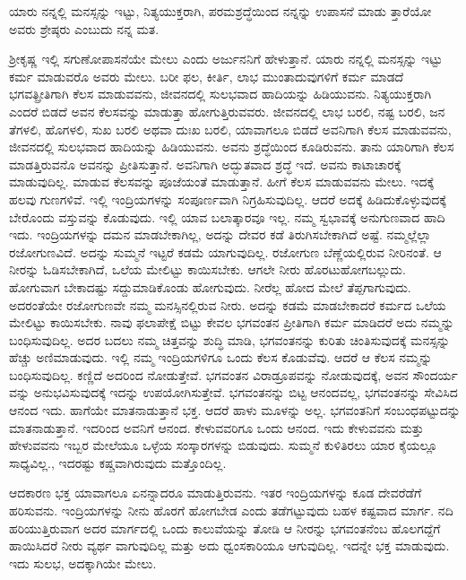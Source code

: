 {\small ಯಾರು ನನ್ನಲ್ಲಿ ಮನಸ್ಸನ್ನು ಇಟ್ಟು, ನಿತ್ಯಯುಕ್ತರಾಗಿ, ಪರಮಶ್ರದ್ಧೆಯಿಂದ ನನ್ನನ್ನು ಉಪಾಸನೆ ಮಾಡು ತ್ತಾರೆಯೋ ಅವರು ಶ್ರೇಷ್ಠರು ಎಂಬುದು ನನ್ನ ಮತ.}

ಶ್ರೀಕೃಷ್ಣ ಇಲ್ಲಿ ಸಗುಣೋಪಾಸನೆಯೇ ಮೇಲು ಎಂದು ಅರ್ಜುನನಿಗೆ ಹೇಳುತ್ತಾನೆ. ಯಾರು ನನ್ನಲ್ಲಿ ಮನಸ್ಸನ್ನು ಇಟ್ಟು ಕರ್ಮ ಮಾಡುವರೊ ಅವರು ಮೇಲು. ಬರೀ ಫಲ, ಕೀರ್ತಿ, ಲಾಭ ಮುಂತಾದುವುಗಳಿಗೆ ಕರ್ಮ ಮಾಡದೆ ಭಗವತ್ಪ್ರೀತಿಗಾಗಿ ಕೆಲಸ ಮಾಡುವವನು, ಜೀವನದಲ್ಲಿ ಸುಲಭವಾದ ಹಾದಿಯನ್ನು ಹಿಡಿಯುವನು. ನಿತ್ಯಯುಕ್ತರಾಗಿ ಎಂದರೆ ಬಿಡದೆ ಅವನ ಕೆಲಸವನ್ನು ಮಾಡುತ್ತಾ ಹೋಗುತ್ತಿರುವವರು. ಜೀವನದಲ್ಲಿ ಲಾಭ ಬರಲಿ, ನಷ್ಟ ಬರಲಿ, ಜನ ತೆಗಳಲಿ, ಹೊಗಳಲಿ, ಸುಖ ಬರಲಿ ಅಥವಾ ದುಃಖ ಬರಲಿ, ಯಾವಾಗಲೂ ಬಿಡದೆ ಅವನಿಗಾಗಿ ಕೆಲಸ ಮಾಡುವವನು, ಜೀವನದಲ್ಲಿ ಸುಲಭವಾದ ಹಾದಿಯನ್ನು ಹಿಡಿಯುವನು. ಅವನು ಶ್ರದ್ಧೆಯಿಂದ ಕೂಡಿರುವನು. ತಾನು ಯಾರಿಗಾಗಿ ಕೆಲಸ ಮಾಡತ್ತಿರುವನೊ ಅವನನ್ನು ಪ್ರೀತಿಸುತ್ತಾನೆ. ಅವನಿಗಾಗಿ ಅದ್ಭುತವಾದ ಶ್ರದ್ಧೆ ಇದೆ. ಅವನು ಕಾಟಾಚಾರಕ್ಕೆ ಮಾಡುವುದಿಲ್ಲ. ಮಾಡುವ ಕೆಲಸವನ್ನು ಪೂಜೆಯಂತೆ ಮಾಡುತ್ತಾನೆ. ಹೀಗೆ ಕೆಲಸ ಮಾಡುವವನು ಮೇಲು. ಇದಕ್ಕೆ ಹಲವು ಗುಣಗಳಿವೆ. ಇಲ್ಲಿ ಇಂದ್ರಿಯಗಳನ್ನು ಸಂಪೂರ್ಣವಾಗಿ ನಿಗ್ರಹಿಸುವುದಿಲ್ಲ. ಆದರೆ ಅದಕ್ಕೆ ಹಿಡಿದುಕೊಳ್ಳುವುದಕ್ಕೆ ಬೇರೊಂದು ವಸ್ತುವನ್ನು ಕೊಡುವುದು. ಇಲ್ಲಿ ಯಾವ ಬಲಾತ್ಕಾರವೂ ಇಲ್ಲ. ನಮ್ಮ ಸ್ವಭಾವಕ್ಕೆ ಅನುಗುಣವಾದ ಹಾದಿ ಇದು. ಇಂದ್ರಿಯಗಳನ್ನು ದಮನ ಮಾಡಬೇಕಾಗಿಲ್ಲ, ಅದನ್ನು ದೇವರ ಕಡೆ ತಿರುಗಿಸಬೇಕಾಗಿದೆ ಅಷ್ಟೆ. ನಮ್ಮಲ್ಲೆಲ್ಲಾ ರಜೋಗುಣವಿದೆ. ಅದನ್ನು ಸುಮ್ಮನೆ ಇಟ್ಟರೆ ಕಡಮೆ ಯಾಗುವುದಿಲ್ಲ. ರಜೋಗುಣ ಬೆಣ್ಣೆಯಲ್ಲಿರುವ ನೀರಿನಂತೆ. ಆ ನೀರನ್ನು ಓಡಿಸಬೇಕಾಗಿದೆ, ಒಲೆಯ ಮೇಲಿಟ್ಟು ಕಾಯಿಸಬೇಕು. ಆಗಲೇ ನೀರು ಹೊರಟುಹೋಗಬಲ್ಲುದು. ಹೋಗುವಾಗ ಬೇಕಾದಷ್ಟು ಸದ್ದುಮಾಡಿಕೊಂಡು ಹೋಗುವುದು. ನೀರೆಲ್ಲ ಹೋದ ಮೇಲೆ ತೆಪ್ಪಗಾಗುವುದು. ಅದರಂತೆಯೇ ರಜೋಗುಣವೇ ನಮ್ಮ ಮನಸ್ಸಿನಲ್ಲಿರುವ ನೀರು. ಅದನ್ನು ಕಡಮೆ ಮಾಡಬೇಕಾದರೆ ಕರ್ಮದ ಒಲೆಯ ಮೇಲಿಟ್ಟು ಕಾಯಿಸಬೇಕು. ನಾವು ಫಲಾಪೇಕ್ಷೆ ಬಿಟ್ಟು ಕೇವಲ ಭಗವಂತನ ಪ್ರೀತಿಗಾಗಿ ಕರ್ಮ ಮಾಡಿದರೆ ಅದು ನಮ್ಮನ್ನು ಬಂಧಿಸುವುದಿಲ್ಲ. ಅದರ ಬದಲು ನಮ್ಮ ಚಿತ್ತವನ್ನು ಶುದ್ಧಿ ಮಾಡಿ, ಭಗವಂತನನ್ನು ಕುರಿತು ಚಿಂತಿಸುವುದಕ್ಕೆ ಮನಸ್ಸನ್ನು ಹೆಚ್ಚು ಅಣಿಮಾಡುವುದು. ಇಲ್ಲಿ ನಮ್ಮ ಇಂದ್ರಿಯಗಳಿಗೂ ಒಂದು ಕೆಲಸ ಕೊಡುವೆವು. ಆದರೆ ಆ ಕೆಲಸ ನಮ್ಮನ್ನು ಬಂಧಿಸುವುದಿಲ್ಲ. ಕಣ್ಣಿದೆ ಅದರಿಂದ ನೋಡುತ್ತೇವೆ. ಭಗವಂತನ ವಿರಾಡ್ರೂಪವನ್ನು ನೋಡುವುದಕ್ಕೆ, ಅವನ ಸೌಂದರ್ಯ ವನ್ನು ಅನುಭವಿಸುವುದಕ್ಕೆ ಇದನ್ನು ಉಪಯೋಗಿಸುತ್ತೇವೆ. ಭಗವಂತನನ್ನು ಬಿಟ್ಟ ಆನಂದವಲ್ಲ, ಭಗವಂತನನ್ನು ಸೇವಿಸಿದ ಆನಂದ ಇದು. ಹಾಗೆಯೇ ಮಾತನಾಡುತ್ತಾನೆ ಭಕ್ತ. ಆದರೆ ಹಾಳು ಮೂಳನ್ನು ಅಲ್ಲ. ಭಗವಂತನಿಗೆ ಸಂಬಂಧಪಟ್ಟುದನ್ನು ಮಾತನಾಡುತ್ತಾನೆ. ಇದರಿಂದ ಅವನಿಗೆ ಆನಂದ. ಕೇಳುವವರಿಗೂ ಒಂದು ಆನಂದ. ಇದು ಕೇಳುವವನು ಮತ್ತು ಹೇಳುವವನು ಇಬ್ಬರ ಮೇಲೆಯೂ ಒಳ್ಳೆಯ ಸಂಸ್ಕಾರಗಳನ್ನು ಬಿಡುವುದು. ಸುಮ್ಮನೆ ಕುಳಿತಿರಲು ಯಾರ ಕೈಯಲ್ಲೂ ಸಾಧ್ಯವಿಲ್ಲ., ಇದರಷ್ಟು ಕಷ್ಚವಾಗಿರುವುದು ಮತ್ತೊಂದಿಲ್ಲ.

ಆದಕಾರಣ ಭಕ್ತ ಯಾವಾಗಲೂ ಏನನ್ನಾದರೂ ಮಾಡುತ್ತಿರುವನು. ಇತರ ಇಂದ್ರಿಯಗಳನ್ನು ಕೂಡ ದೇವರೆಡೆಗೆ ಹರಿಸುವನು. ಇಂದ್ರಿಯಗಳನ್ನು ನೀನು ಹೊರಗೆ ಹೋಗಬೇಡ ಎಂದು ತಡೆಗಟ್ಟುವುದು ಬಹಳ ಕಷ್ಟವಾದ ಮಾರ್ಗ. ನದಿ ಹರಿಯುತ್ತಿರುವಾಗ ಅದರ ಮಾರ್ಗದಲ್ಲಿ ಒಂದು ಕಾಲುವೆಯನ್ನು ತೋಡಿ ಆ ನೀರನ್ನು ಭಗವಂತನೆಂಬ ಹೊಲಗದ್ದೆಗೆ ಹಾಯಿಸಿದರೆ ನೀರು ವ್ಯರ್ಥ ವಾಗುವುದಿಲ್ಲ ಮತ್ತು ಅದು ಧ್ವಂಸಕಾರಿಯೂ ಆಗುವುದಿಲ್ಲ. ಇದನ್ನೇ ಭಕ್ತ ಮಾಡುವುದು. ಇದು ಸುಲಭ, ಅದಕ್ಕಾಗಿಯೇ ಮೇಲು.

